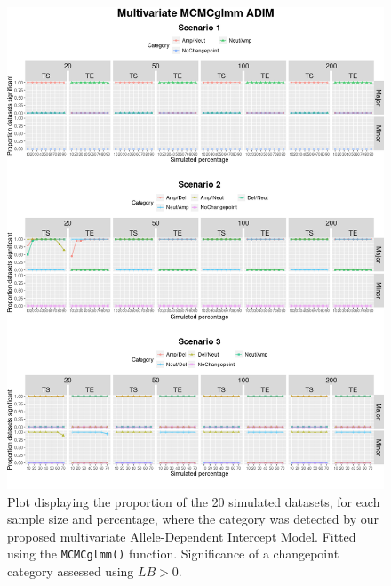 \begin{figure}[!htb]
\vspace{1.6cm}
\center
\includegraphics[width = 1\textwidth]{../figures/Chapter_5/MCMC_multi_sim_plot.png}
\caption[Plot displaying the proportion of the 20 simulated datasets, for each sample size and percentage, where the category was detected by our proposed multivariate Allele-Dependent Intercept Model (\texttt{MCMCglmm()}).]{Plot displaying the proportion of the 20 simulated datasets, for each sample size and percentage, where the category was detected by our proposed multivariate Allele-Dependent Intercept Model. Fitted using the \texttt{MCMCglmm()} function. Significance of a changepoint category assessed using $LB > 0$.}
\label{fig:Multi_mcmc_SimStudy}
\end{figure}

